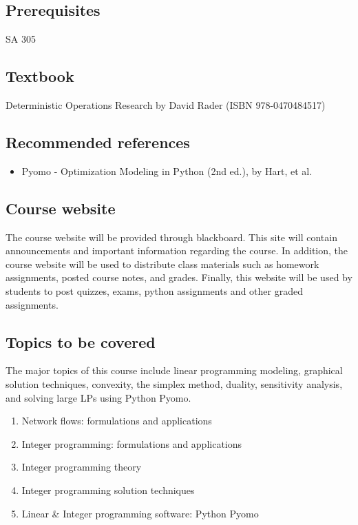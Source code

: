 \documentclass[letterpaper,hidelinks,oneside,11pt]{article}%
\begin{document}
\subsection*{Prerequisites}

SA 305

\subsection*{Textbook} 

Deterministic Operations Research by David Rader (ISBN  978-0470484517)


\subsection*{Recommended references}
\begin{itemize} \itemsep0em 
	\item Pyomo - Optimization Modeling in Python (2nd ed.), by Hart, et al.
\end{itemize}


\subsection*{Course website}
The course website will be provided through blackboard. This site will contain announcements and important information regarding the course. In addition, the course website will be used to distribute class materials such as homework assignments, posted course notes, and grades. Finally, this website will be used by students to post quizzes, exams, python assignments and other graded assignments.

\subsection*{Topics to be covered}
The major topics of this course include linear programming modeling, graphical solution techniques, convexity, the simplex method, duality, sensitivity analysis, and solving large LPs using Python Pyomo.
\begin{enumerate} \itemsep0em 
	\item Network flows: formulations and applications
	\item Integer programming: formulations and applications
	\item Integer programming theory
	\item Integer programming solution techniques
	\item Linear \& Integer programming software: Python Pyomo
\end{enumerate}
\end{document}
